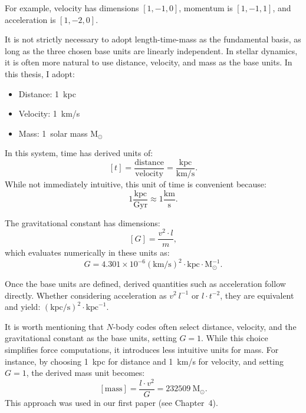     For example, velocity has dimensions $[1, -1, 0]$, momentum is $[1, -1, 1]$, and acceleration is $[1, -2, 0]$.

    It is not strictly necessary to adopt length-time-mass as the fundamental basis, as long as the three chosen base units are linearly independent. In stellar dynamics, it is often more natural to use distance, velocity, and mass as the base units. In this thesis, I adopt:
    \begin{itemize}
        \item Distance: 1~kpc
        \item Velocity: 1~km/s 
        \item Mass: 1~solar mass $\mathrm{M}_\odot$
    \end{itemize}

    In this system, time has derived units of:
    \begin{equation}
        \left[t\right] = \frac{\mathrm{distance}}{\mathrm{velocity}} = \frac{\mathrm{kpc}}{\mathrm{km/s}}.
    \end{equation}
    While not immediately intuitive, this unit of time is convenient because:
    \begin{equation}
        1\frac{\mathrm{kpc}}{\mathrm{Gyr}} \approx 1\frac{\mathrm{km}}{\mathrm{s}}.
    \end{equation}

    The gravitational constant has dimensions:
    \begin{equation}    
        \left[G\right]=\frac{v^2 \cdot l}{m},
    \end{equation} 
    which evaluates numerically in these units as: 
    \begin{equation}
        G = 4.301 \times 10^{-6} \left(\mathrm{km}/\mathrm{s}\right)^2 \cdot \mathrm{kpc} \cdot \mathrm{M}_\odot^{-1}.
    \end{equation}

    Once the base units are defined, derived quantities such as acceleration follow directly. Whether considering acceleration as $v^2~l^{-1}$ or $l \cdot t^{-2}$, they are equivalent and yield: $\left(\mathrm{kpc}/\mathrm{s}\right)^2 \cdot \mathrm{kpc}^{-1}$.

    It is worth mentioning that $N$-body codes often select distance, velocity, and the gravitational constant as the base units, setting $G = 1$. While this choice simplifies force computations, it introduces less intuitive units for mass. For instance, by choosing 1~kpc for distance and 1~km/s for velocity, and setting $G = 1$, the derived mass unit becomes:
    \begin{equation}
        \left[\mathrm{mass}\right] = \frac{l \cdot v^2}{G} = 232509~\mathrm{M}_\odot.
    \end{equation} This approach was used in our first paper (see Chapter~4). 
    
